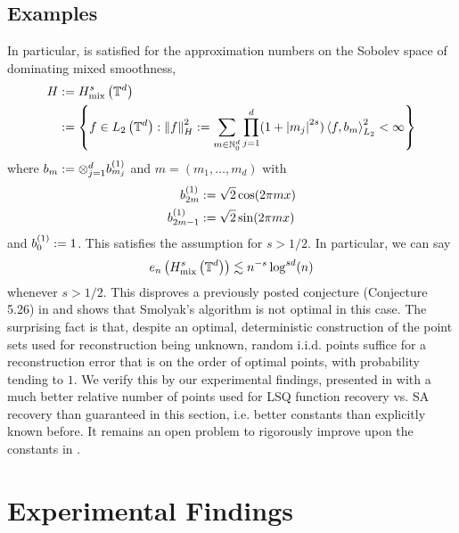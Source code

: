 \documentclass[12pt, oneside]{amsart}
\theoremstyle{definition}
\theoremstyle{remark}
\numberwithin{equation}{section}
\begin{document}
\subsection*{Examples}
In particular,  is satisfied for the 
approximation numbers on the Sobolev space of dominating mixed smoothness, 
\begin{align*}
    H &\defn H_{\text{mix}}^s\left(\T^d\right)\\
    &\defn \set{f \in L_2\left(\T^d\right) : \norm[H]{f}^2 \defn \sum_{m \in 
    \N_0^d} \prod_{j=1}^d (1+\abs{m_j}^{2s}) \inner{f}{b_m}^2_{L_2} < \infty}
\end{align*}
where \(b_m \defn \otimes_{j=1}^d b_{m_j}^{(1)}\) and \(m = (m_1, \dots, m_d)\) with \begin{align*}
    b_{2m}^{(1)} &\defn \sqrt{2}\cos(2\pi m x)\\
    b_{2m-1}^{(1)} &\defn \sqrt{2}\sin(2\pi m x)
\end{align*}
and \(b_0^{(1)} \defn 1\). This satisfies the assumption for \(s > 1/2\). In 
particular, we can say
\begin{equation}\label{eq:conclusio}
    e_n\left( H_{\text{mix}}^s\left(\T^d\right) \right) \lesssim n^{-s}\log^{sd}(n)
\end{equation}
whenever \(s > 1/2\). This disproves a previously posted conjecture (Conjecture 
5.26) in \cite{Dung_Temlyakov_Ullrich_2018} and shows that Smolyak's algorithm 
is not optimal in this case. The surprising fact is that, despite an optimal, 
deterministic construction of the point sets used for reconstruction being 
unknown, random i.i.d. points suffice for a reconstruction error that is on the 
order of optimal points, with probability tending to \(1\). We verify this by 
our experimental findings, presented in  with a 
much better relative number of points used for LSQ function recovery vs. SA 
recovery than guaranteed in this section, i.e. better constants than explicitly 
known before. It remains an open problem to rigorously improve upon the 
constants in .

\section{Experimental Findings}\label{sec:experimentalFindings}

\end{document}

